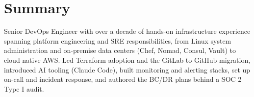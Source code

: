 
\section{Summary}
\vspace{0.5em}
{\small
\hspace{0.7em}\begin{minipage}[t]{\dimexpr\linewidth - 1.4em\relax}
Senior DevOps Engineer with over a decade of hands-on infrastructure experience spanning platform engineering and SRE responsibilities, from Linux system administration and on-premise data centers (Chef, Nomad, Consul, Vault) to cloud-native AWS. Led Terraform adoption and the GitLab-to-GitHub migration, introduced AI tooling (Claude Code), built monitoring and alerting stacks, set up on-call and incident response, and authored the BC/DR plans behind a SOC 2 Type I audit.
\vspace{0.5em}
\end{minipage}
}
